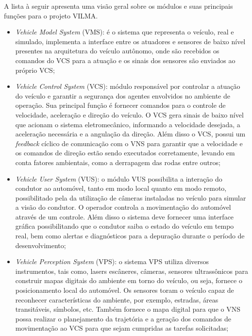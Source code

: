 \documentclass[conference]{IEEEtran}
\begin{document}
A lista à seguir apresenta uma visão geral sobre os módulos e suas principais funções para o projeto VILMA.

\begin{itemize}
	\item \textit{Vehicle Model System} (VMS): é o sistema que representa o veículo, real e simulado, implementa a interface entre os atuadores e sensores de baixo nível presentes na arquitetura do veículo autônomo, onde são recebidos os comandos do VCS para a atuação e os sinais dos sensores são enviados ao próprio VCS;
	
	\item \textit{Vehicle Control System} (VCS): módulo responsável por controlar a atuação do veículo e garantir a segurança dos agentes envolvidos no ambiente de operação. Sua principal função é fornecer comandos para o controle de velocidade, aceleração e direção do veículo. O VCS gera sinais de baixo nível que acionam o sistema eletromecânico, informando a velocidade desejada, a aceleração necessária e a angulação da direção. Além disso o VCS, possui um \textit{feedback} cíclico de comunicação com o VNS para garantir que a velocidade e os comandos de direção estão sendo executados corretamente, levando em conta fatores ambientais, como a derrapagem das rodas entre outros;
	
	\item \textit{Vehicle User System} (VUS): o módulo VUS possibilita a interação do condutor ao automóvel, tanto em modo local quanto em modo remoto, possibilitado pela da utilização de câmeras instaladas no veículo para simular a visão do condutor. O operador controla a movimentação do automóvel através de um controle. Além disso o sistema deve fornecer uma interface gráfica possibilitando que o condutor saiba o estado do veículo em tempo real, bem como alertas e diagnósticos para a depuração durante o período de desenvolvimento;  
	
	\item \textit{Vehicle Perception System} (VPS): o sistema VPS utiliza diversos instrumentos, tais como, lasers escâneres, câmeras, sensores ultrassônicos para construir mapas digitais do ambiente em torno do veículo, ou seja, fornece o posicionamento local do automóvel. Os sensores toram o veículo capaz de reconhecer características do ambiente, por exemplo, estradas, áreas transitáveis, símbolos, etc. Também fornece o mapa digital para que o VNS possa realizar o planejamento da trajetória e a geração dos comandos de movimentação ao VCS para que sejam cumpridas as tarefas solicitadas;
	

\end{itemize}
\end{document}
